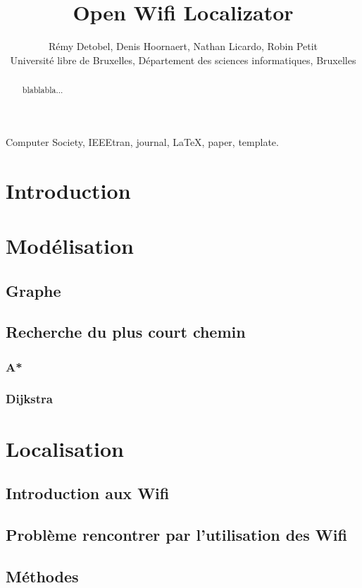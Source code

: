 \documentclass[11pt,journal,compsoc]{IEEEtran}
\begin{document}
\title{Open Wifi Localizator}
\author{Rémy Detobel, Denis Hoornaert, Nathan Licardo, Robin Petit\\ Université libre de Bruxelles, Département des sciences informatiques, Bruxelles}

\maketitle


\begin{abstract}
  blablabla...
\end{abstract}
\begin{IEEEkeywords}
  Computer Society, IEEEtran, journal, \LaTeX, paper, template.
\end{IEEEkeywords}
\section{Introduction}
\section{Modélisation}
  \subsection{Graphe}
  \subsection{Recherche du plus court chemin}
    \subsubsection{A*}
    \subsubsection{Dijkstra}
\section{Localisation}
  \subsection{Introduction aux Wifi}
  \subsection{Problème rencontrer par l'utilisation des Wifi}
  \subsection{Méthodes}
\end{document}
